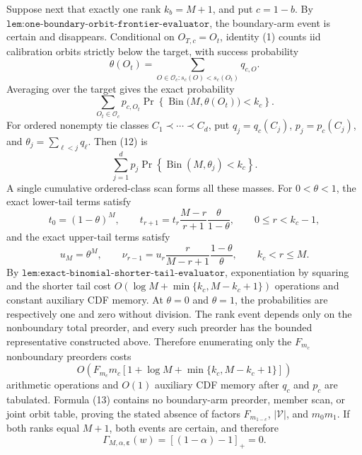 Suppose next that exactly one rank \(k_b=M+1\), and put \(c=1-b\). By \(\texttt{lem:one-boundary-orbit-frontier-evaluator}\), the boundary-arm event is certain and disappears. Conditional on \(O_{T,c}=O_t\), identity (1) counts iid calibration orbits strictly below the target, with success probability
\[
\theta(O_t)=\sum_{O\in\mathcal O_c:s_c(O)<s_c(O_t)}q_{c,O}.
\]
Averaging over the target gives the exact probability
\[
\sum_{O_t\in\mathcal O_c}p_{c,O_t}
\Pr\!\left\{\operatorname{Bin}\bigl(M,\theta(O_t)\bigr)<k_c\right\}. \tag{12}
\]
For ordered nonempty tie classes \(C_1\prec\cdots\prec C_d\), put \(q_j=q_c(C_j)\), \(p_j=p_c(C_j)\), and \(\theta_j=\sum_{\ell<j}q_\ell\). Then (12) is
\[
\sum_{j=1}^d p_j\Pr\!\left\{\operatorname{Bin}(M,\theta_j)<k_c\right\}. \tag{13}
\]
A single cumulative ordered-class scan forms all these masses. For \(0<\theta<1\), the exact lower-tail terms satisfy
\[
t_0=(1-\theta)^M,\qquad
t_{r+1}=t_r\frac{M-r}{r+1}\frac{\theta}{1-\theta},\qquad 0\le r<k_c-1, \tag{14}
\]
and the exact upper-tail terms satisfy
\[
u_M=\theta^M,\qquad\nu_{r-1}=u_r\frac{r}{M-r+1}\frac{1-\theta}{\theta},\qquad k_c<r\le M. \tag{15}
\]
By \(\texttt{lem:exact-binomial-shorter-tail-evaluator}\), exponentiation by squaring and the shorter tail cost \(O(\log M+\min\{k_c,M-k_c+1\})\) operations and constant auxiliary CDF memory. At \(\theta=0\) and \(\theta=1\), the probabilities are respectively one and zero without division. The rank event depends only on the nonboundary total preorder, and every such preorder has the bounded representative constructed above. Therefore enumerating only the \(F_{m_c}\) nonboundary preorders costs
\[
O\!\left(F_{m_c}m_c\left[1+\log M+\min\{k_c,M-k_c+1\}\right]\right) \tag{16}
\]
arithmetic operations and \(O(1)\) auxiliary CDF memory after \(q_c\) and \(p_c\) are tabulated. Formula (13) contains no boundary-arm preorder, member scan, or joint orbit table, proving the stated absence of factors \(F_{m_{1-c}}\), \(|\mathcal V|\), and \(m_0m_1\). If both ranks equal \(M+1\), both events are certain, and therefore
\[
\Gamma_{M,\alpha,\boldsymbol\varepsilon}(w)=[(1-\alpha)-1]_+=0. \tag{17}
\]

